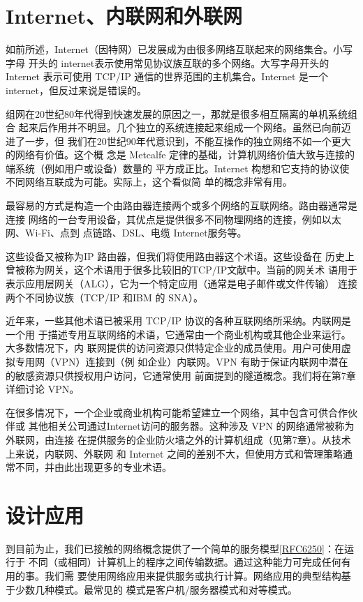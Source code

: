 \section{Internet、内联网和外联网}
如前所述，Internet（因特网）已发展成为由很多网络互联起来的网络集合。小写字母
开头的 internet表示使用常见协议族互联的多个网络。大写字母开头的 Internet 表示可使用
TCP/IP 通信的世界范围的主机集合。Internet 是一个 internet，但反过来说是错误的。

组网在20世纪80年代得到快速发展的原因之一，那就是很多相互隔离的单机系统组合
起来后作用并不明显。几个独立的系统连接起来组成一个网络。虽然已向前迈进了一步，但
我们在20世纪90年代意识到，不能互操作的独立网络不如一个更大的网络有价值。这个概
念是 Metcalfe 定律的基础，计算机网络价值大致与连接的端系统（例如用户或设备）数量的
平方成正比。Internet 构想和它支持的协议使不同网络互联成为可能。实际上，这个看似简
单的概念非常有用。

最容易的方式是构造一个由路由器连接两个或多个网络的互联网络。路由器通常是连接
网络的一台专用设备，其优点是提供很多不同物理网络的连接，例如以太网、Wi-Fi、点到
点链路、DSL、电缆 Internet服务等。

\begin{tcolorbox}
  这些设备又被称为IP 路由器，但我们将使用路由器这个术语。这些设备在
  历史上曾被称为网关，这个术语用于很多比较旧的TCP/IP文献中。当前的网关术
  语用于表示应用层网关（ALG），它为一个特定应用（通常是电子邮件或文件传输）
  连接两个不同协议族（TCP/IP 和IBM 的 SNA）。
\end{tcolorbox}
近年来，一些其他术语已被采用 TCP/IP 协议的各种互联网络所采纳。内联网是一个用
于描述专用互联网络的术语，它通常由一个商业机构或其他企业来运行。大多数情况下，内
联网提供的访问资源只供特定企业的成员使用。用户可使用虚拟专用网（VPN）连接到（例
如企业）内联网。VPN 有助于保证内联网中潜在的敏感资源只供授权用户访问，它通常使用
前面提到的隧道概念。我们将在第7章详细讨论 VPN。

在很多情况下，一个企业或商业机构可能希望建立一个网络，其中包含可供合作伙伴或
其他相关公司通过Internet访问的服务器。这种涉及 VPN 的网络通常被称为外联网，由连接
在提供服务的企业防火墙之外的计算机组成（见第7章）。从技术上来说，内联网、外联网
和 Internet 之间的差别不大，但使用方式和管理策略通常不同，并由此出现更多的专业术语。

\section{设计应用}
到目前为止，我们已接触的网络概念提供了一个简单的服务模型\href{https://www.rfc-editor.org/rfc/rfc6250}{[RFC6250]}：在运行于
不同（或相同）计算机上的程序之间传输数据。通过这种能力可完成任何有用的事。我们需
要使用网络应用来提供服务或执行计算。网络应用的典型结构基于少数几种模式。最常见的
模式是客户机/服务器模式和对等模式。

